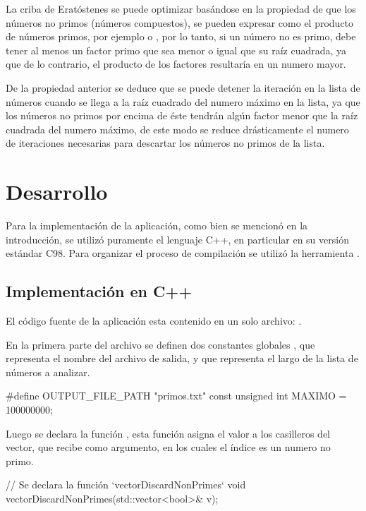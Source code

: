 \documentclass[12pt]{article}
\newenvironment{fullgrayverb}
{\verbbox}
{\endverbbox\par\colorbox{gray!25}{\parbox{\textwidth}{\theverbbox}}\par}
\begin{document}
La criba de Eratóstenes se puede optimizar basándose en la propiedad de que los
números no primos (números compuestos), se pueden expresar como el producto de
números primos, por ejemplo  o , por lo tanto, si
un número no es primo, debe tener al menos un factor primo que sea menor o igual
que su raíz cuadrada, ya que de lo contrario, el producto de los factores
resultaría en un numero mayor.

De la propiedad anterior se deduce que se puede detener la iteración en la lista
de números cuando se llega a la raíz cuadrado del numero máximo en la lista, ya
que los números no primos por encima de éste tendrán algún factor menor que la
raíz cuadrada del numero máximo, de este modo se reduce drásticamente el numero
de iteraciones necesarias para descartar los números no primos de la lista.

\section{Desarrollo}

Para la implementación de la aplicación, como bien se mencionó en la
introducción, se utilizó puramente el lenguaje C++, en particular en su versión
estándar C98. Para organizar el proceso de compilación se utilizó la herramienta
.

\subsection{Implementación en C++}

El código fuente de la aplicación esta contenido en un solo archivo:
.

En la primera parte del archivo se definen dos constantes globales
, que representa el nombre del archivo de salida, y
 que representa el largo de la lista de números a analizar.

\begin{fullgrayverb}[\mbox{}]
#define OUTPUT_FILE_PATH "primos.txt"
const unsigned int MAXIMO = 100000000;
\end{fullgrayverb}

Luego se declara la función , esta función asigna
el valor  a los casilleros del vector, que recibe como argumento, en
los cuales el índice es un numero no primo.

\begin{fullgrayverb}[\mbox{}]
// Se declara la función `vectorDiscardNonPrimes`
void vectorDiscardNonPrimes(std::vector<bool>& v);
\end{fullgrayverb}
\end{document}
